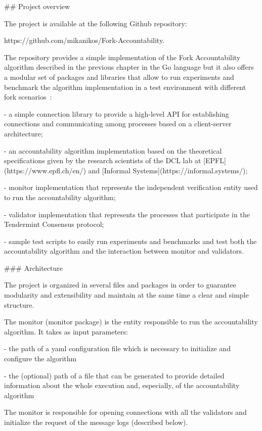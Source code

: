 \documentclass[a4paper,11pt,oneside]{report}
\begin{document}
\begin{markdown}

## Project overview

The project is available at the following Github repository: 

    https://github.com/mikanikos/Fork-Accountability. 

The repository provides a simple implementation of the Fork Accountability algorithm described in the previous chapter in the Go language but it also offers a modular set of packages and libraries that allow to run experiments and benchmark the algorithm implementation in a test environment with different fork scenarios~\cite{github-project}:

- a simple connection library to provide a high-level API for establishing connections and communicating among processes based on a client-server architecture; 

- an accountability algorithm implementation based on the theoretical specifications given by the research scientists of the DCL lab at [EPFL](https://www.epfl.ch/en/) and [Informal Systems](https://informal.systems/);  

- monitor implementation that represents the independent verification entity used to run the accountability algorithm;  

- validator implementation that represents the processes that participate in the Tendermint Consensus protocol; 

- sample test scripts to easily run experiments and benchmarks and test both the accountability algorithm and the interaction between monitor and validators.

### Architecture

The project is organized in several files and packages in order to guarantee modularity and extensibility and maintain at the same time a clear and simple structure.

The monitor (monitor package) is the entity responsible to run the accountability algorithm. It takes as input parameters:

- the path of a yaml configuration file which is necessary to initialize and configure the algorithm

- the (optional) path of a file that can be generated to provide detailed information about the whole execution and, especially, of the accountability algorithm

The monitor is responsible for opening connections with all the validators and initialize the request of the message logs (described below).


\end{markdown}
\end{document}
